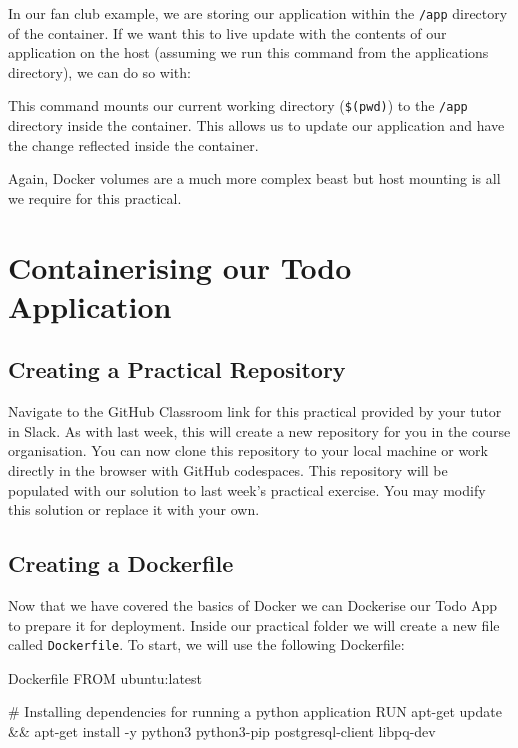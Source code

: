 \documentclass{csse4400}
\begin{document}
In our fan club example,
we are storing our application within the \texttt{/app} directory of the container.
If we want this to live update with the contents of our application on the host (assuming we run this command from the applications directory), we can do so with:

This command mounts our current working directory (\texttt{\$(pwd)}) to the \texttt{/app} directory inside the container.
This allows us to update our application and have the change reflected inside the container.

Again, Docker volumes are a much more complex beast but host mounting is all we require for this practical.

\section{Containerising our Todo Application}


\subsection{Creating a Practical Repository}
Navigate to the GitHub Classroom link for this practical provided by your tutor in Slack.
As with last week, this will create a new repository for you in the course organisation.
You can now clone this repository to your local machine or work directly in the browser with GitHub codespaces.
This repository will be populated with our solution to last week's practical exercise.
You may modify this solution or replace it with your own.

\subsection{Creating a Dockerfile}

Now that we have covered the basics of Docker we can Dockerise our Todo App to prepare it for deployment.
Inside our practical folder we will create a new file called \texttt{Dockerfile}.
To start, we will use the following Dockerfile:

\begin{code}[language=docker,numbers=none]{Dockerfile}
FROM ubuntu:latest

# Installing dependencies for running a python application
RUN apt-get update && apt-get install -y python3 python3-pip postgresql-client libpq-dev
\end{code}
\end{document}
